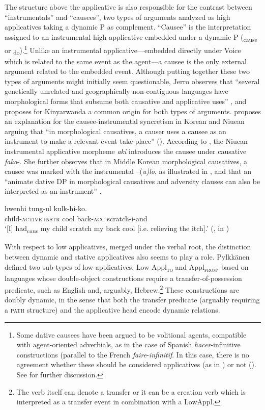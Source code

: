 \documentclass[output=paper,colorlinks,citecolor=brown,nonflat]{./langscibook}
\begin{document}
The structure above the applicative is also responsible for the contrast between “instrumentals” and “causees”, two types of arguments analyzed as high applicatives taking a dynamic \liv P as complement. “Causee” is the interpretation assigned to an instrumental high applicative embedded under a dynamic \liv P (\liv\textsubscript{cause}  or \liv \textsubscript{do}).\footnote{Some dative causees have been argued to be volitional agents, compatible with agent-oriented adverbials, as in the case of Spanish \textit{hacer}-infinitive constructions (parallel to the French \textit{faire}-\textit{infinitif}. In this case, there is no agreement whether these should be considered applicatives (as in \citealt{Torrego2011}) or not (\citealt{Kim2011high, Tubino2012}). See  for further discussion.} Unlike an instrumental applicative—embedded directly under Voice which is related to the same event as the agent—a causee is the only external argument related to the embedded event. Although putting together these two types of arguments might initially seem questionable, Jerro observes that “several genetically unrelated and geographically non-contiguous languages have morphological forms that subsume both causative and applicative uses” \citep[752]{Jerro2017}, and proposes for Kinyarwanda a common origin for both types of arguments.  \citet{Kim2011high} proposes an explanation for the causee-instrumental syncretism in Korean and Niuean arguing that “in morphological causatives, a causer uses a causee as an instrument to make a relevant event take place” (\citeyear[499]{Kim2011high}). According to \citeauthor{Kim2011high}, the Niuean instrumental applicative morpheme \textit{aki} introduces the causee under causative \textit{faka}-. She further observes that in Middle Korean morphological causatives, a causee was marked with the instrumental –(\textit{u)lo}, as illustrated in , and that an “animate dative DP in morphological causatives and adversity clauses can also be interpreted as an instrument” \citep[499]{Kim2011high}.

\ea%
    \label{ex:cuervo:5}
     {hwenhi} {tung-ul} {kulk-hi-ko}.\\
    child\textsc{-active.instr} cool back\textsc{-acc} scratch-i-and\\
    \glt ‘[I] had\textsubscript{caus} my child scratch my back cool [i.e. relieving the   itch].’  (\citealt{Park1994}, in \citealt[499]{Kim2011high})
    \z

With respect to low applicatives, merged under the verbal root, the distinction between dynamic and stative applicatives also seems to play a role. Pylkkänen defined two sub-types of low applicatives, Low Appl\textsc{\textsubscript{to}}\textsubscript{} and Appl\textsc{\textsubscript{from}}, based on languages whose double-object constructions require a transfer-of-possession predicate, such as English and, arguably, Hebrew.\footnote{The verb itself can denote a transfer or it can be a creation verb which is interpreted as a transfer event in combination with a LowAppl.} These constructions are doubly dynamic, in the sense that both the transfer predicate (arguably requiring a \textsc{path} structure) and the applicative head encode dynamic relations.
\end{document}

